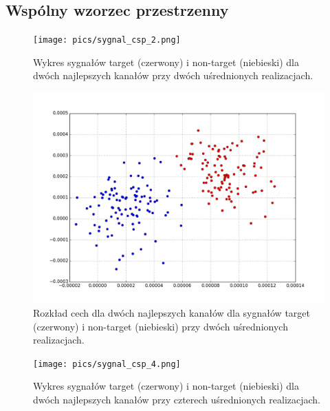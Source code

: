 \documentclass[licencjacka,openright]{pracamgr}
\begin{document}
\subsection{Wspólny wzorzec przestrzenny}

\begin{figure}[H]
\centering
\texttt{[image: pics/sygnal\_csp\_2.png]}
\caption{Wykres sygnałów target (czerwony) i non-target (niebieski) dla dwóch najlepszych kanałów przy dwóch uśrednionych realizacjach.}
\label{sygnal_csp_2}
\end{figure}

\begin{figure}[H]
\centering
\includegraphics[scale=0.55, trim=0mm 0mm 0mm 0mm, clip=True]{pics/cecha_csp_2.png}
\caption{Rozkład cech dla dwóch najlepszych kanałów dla sygnałów target (czerwony) i non-target (niebieski) przy dwóch uśrednionych realizacjach.}
\label{cecha_csp_2}
\end{figure}


\begin{figure}[H]
\centering
\texttt{[image: pics/sygnal\_csp\_4.png]}
\caption{Wykres sygnałów target (czerwony) i non-target (niebieski) dla dwóch najlepszych kanałów przy czterech uśrednionych realizacjach.}
\label{sygnal_csp_4}
\end{figure}
\end{document}
